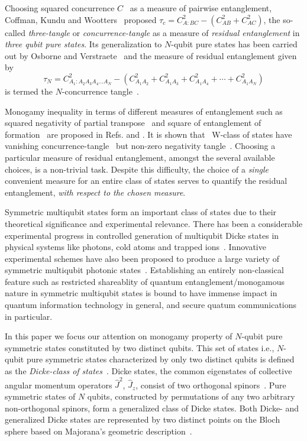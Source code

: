 \documentclass[pra,a4paper,showpacs,superscriptaddress]{revtex4}
\newcommand{\be}{\begin{equation}}
\newcommand{\ee}{\end{equation}}
\begin{document}
Choosing squared concurrence $C$~\cite{con1,con2} as a measure of pairwise entanglement, Coffman, Kundu and Wootters~\cite{ckw} proposed $\tau_c=C^2_{A:BC}-(C^2_{AB} + C^2_{AC})$, the so-called {\emph {three-tangle}} or {\emph {concurrence-tangle}} as a measure of {\emph{residual entanglement}} in {\emph{three qubit pure states}}. Its generalization to $N$-qubit pure states has been carried out by Osborne and Verstraete~\cite{osb} and the measure of residual entanglement given by
 \be
\label{Ncon}
\tau_N=C_{A_{1}:A_{2}A_{3}A_{4} \ldots A_{N}}^{2}-\left( C_{A_{1}A_{2}}^{2} + C_{A_{1}A_{3}}^{2}+C_{A_{1}A_{4}}^{2} + \cdots+ C_{A_{1}A_{N}}^{2} \right)
\ee 
is termed the $N$-concurrence tangle~\cite{osb}. 

Monogamy inequality in terms of different measures of entanglement such as squared negativity of partial transpose~\cite{ppt1,ppt2,ppt3} and square of entanglement of formation~\cite{con1,con2} are proposed in Refs. \cite{neg} and \cite{bai2}. It is shown that~\cite{pjg2} 
W-class of states have vanishing concurrence-tangle~\cite{ckw} but non-zero negativity tangle~\cite{neg,pjg2}. Choosing a particular measure of residual entanglement, amongst the several available choices, is a non-trivial task. 
Despite this difficulty, the choice of a {\emph {single}} convenient measure for an entire class of states serves to quantify the residual entanglement, {\emph{with respect to the chosen measure}}.  


Symmetric multiqubit states form an important class of states due to their theoretical significance and experimental relevance. There has been a considerable experimental progress in controlled generation of multiqubit Dicke states in physical systems like photons, cold atoms and trapped ions~\cite{2004,2009,multi2009,Ion2009,NatCom2017}. Innovative experimental schemes have also been proposed to produce a large variety of symmetric multiqubit photonic states~\cite{newexpt1,newexpt2}. Establishing an entirely non-classical feature such as restricted shareablity of quantum entanglement/monogamous nature in symmetric multiqubit states is bound to have immense impact in quantum information technology in general, and secure quatum communications in particular. 

In this paper we focus our attention on monogamy property of $N$-qubit pure symmetric states constituted by two distinct qubits. This set of states i.e., $N$-qubit pure symmetric states characterized by only two distinct qubits is defined as the {\emph{Dicke-class of states}}~\cite{spin1,spin2}. Dicke states, the common eigenstates of collective angular momentum operators $\hat{J}^2$, $\hat{J}_z$, consist of two orthogonal spinors~\cite{spin1,spin2}. Pure symmetric states of $N$ qubits, constructed by permutations of any two arbitrary non-orthogonal spinors, form a generalized class of Dicke states. Both Dicke- and generalized Dicke states are represented by two distinct points on the Bloch sphere based on Majorana's geometric description~\cite{maj,solano,bastin,usrmaj,ref2a,ref2b}. 
\end{document}
